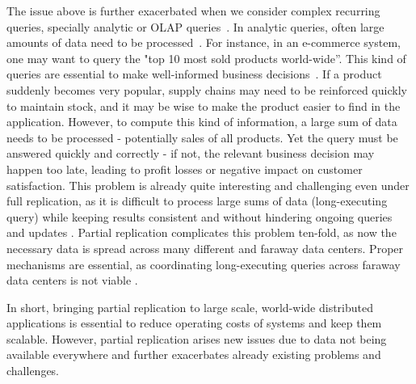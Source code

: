 The issue above is further exacerbated when we consider complex recurring queries, specially analytic or OLAP queries~\cite{dbtoaster,viewSelection,sioulas2023real}.
In analytic queries, often large amounts of data need to be processed~\cite{clickhouse2024, analyticdb}.
For instance, in an e-commerce system, one may want to query the "top 10 most sold products world-wide''.
This kind of queries are essential to make well-informed business decisions~\cite{clickhouse2024, hadad}.
If a product suddenly becomes very popular, supply chains may need to be reinforced quickly to maintain stock, and it may be wise to make the product easier to find in the application.
However, to compute this kind of information, a large sum of data needs to be processed - potentially sales of all products.
Yet the query must be answered quickly and correctly - if not, the relevant business decision may happen too late, leading to profit losses or negative impact on customer satisfaction.
This problem is already quite interesting and challenging even under full replication, as it is difficult to process large sums of data (long-executing query) while keeping results consistent and without hindering ongoing queries and updates \cite{analyticdb}.
Partial replication complicates this problem ten-fold, as now the necessary data is spread across many different and faraway data centers.
Proper mechanisms are essential, as coordinating long-executing queries across faraway data centers is not viable \cite{clickhouse2024}.

In short, bringing partial replication to large scale, world-wide distributed applications is essential to reduce operating costs of systems and keep them scalable.
However, partial replication arises new issues due to data not being available everywhere and further exacerbates already existing problems and challenges.



